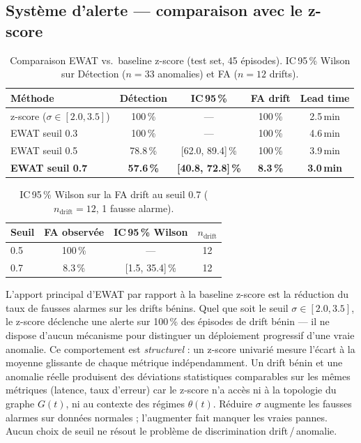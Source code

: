 \subsection{Système d'alerte --- comparaison avec le z-score}
\label{sec:alerts_results}

\begin{table}[h]
\centering
\caption{Comparaison EWAT vs.\ baseline z-score (test set, 45 épisodes).
  IC\,95\,\% Wilson sur Détection ($n=33$ anomalies) et FA ($n=12$ drifts).}
\label{tab:alerts}
\begin{tabular}{lcccc}
\toprule
\textbf{Méthode} & \textbf{Détection} & \textbf{IC\,95\,\%} & \textbf{FA drift} & \textbf{Lead time} \\
\midrule
z-score ($\sigma \in [2.0, 3.5]$) & 100\,\% & --- & 100\,\% & 2.5\,min \\
EWAT seuil 0.3 & 100\,\% & --- & 100\,\% & 4.6\,min \\
EWAT seuil 0.5 & 78.8\,\% & [62.0, 89.4]\,\% & 100\,\% & 3.9\,min \\
\textbf{EWAT seuil 0.7} & \textbf{57.6\,\%} & \textbf{[40.8, 72.8]\,\%} & \textbf{8.3\,\%} & \textbf{3.0\,min} \\
\bottomrule
\end{tabular}
\end{table}

\begin{table}[h]
\centering
\caption{IC\,95\,\% Wilson sur la FA drift au seuil 0.7 ($n_\text{drift}=12$, 1 fausse alarme).}
\label{tab:alerts_ci_fa}
\begin{tabular}{lccc}
\toprule
\textbf{Seuil} & \textbf{FA observée} & \textbf{IC\,95\,\% Wilson} & \textbf{$n_\text{drift}$} \\
\midrule
0.5 & 100\,\% & --- & 12 \\
0.7 & 8.3\,\% & [1.5, 35.4]\,\% & 12 \\
\bottomrule
\end{tabular}
\end{table}

L'apport principal d'EWAT par rapport à la baseline z-score est la réduction du taux de
fausses alarmes sur les drifts bénins. Quel que soit le seuil $\sigma \in [2.0, 3.5]$,
le z-score déclenche une alerte sur 100\,\% des épisodes de drift bénin --- il ne dispose
d'aucun mécanisme pour distinguer un déploiement progressif d'une vraie anomalie.
Ce comportement est \emph{structurel} : un z-score univarié mesure l'écart à la moyenne
glissante de chaque métrique indépendamment. Un drift bénin et une anomalie réelle
produisent des déviations statistiques comparables sur les mêmes métriques (latence,
taux d'erreur) car le z-score n'a accès ni à la topologie du graphe $G(t)$, ni au
contexte des régimes $\theta(t)$. Réduire $\sigma$ augmente les fausses alarmes sur
données normales ; l'augmenter fait manquer les vraies pannes.
Aucun choix de seuil ne résout le problème de discrimination drift\,/\,anomalie.

